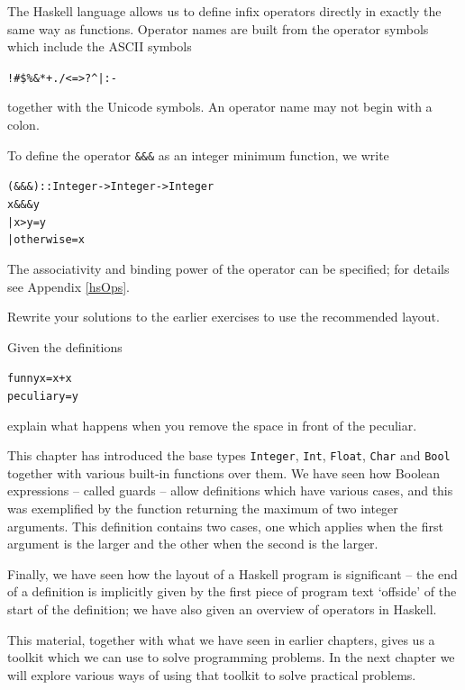 The Haskell language allows us to define infix operators directly in exactly the same way
as functions.
Operator names are built from the operator symbols which include the
ASCII symbols

\begin{alltt}
! \# \$ \% \& * + . / < = > ? \@ \bs{} \^{} | : - \twid
\end{alltt}
together with the Unicode symbols. An operator name may not begin with a
colon.

To define the operator \texttt{\&\&\&} as an integer minimum function, we
write

\begin{alltt}
(\&\&\&) :: Integer -> Integer -> Integer\minx{\&\&\&}
x \&\&\& y 
  | x > y       = y
  | otherwise   = x
\end{alltt}
The associativity and binding power of the operator can be specified; for details
see Appendix \ref{hsOps}.

\begin{exercises}

\item Rewrite your solutions to the earlier exercises to use the recommended
layout.

\item Given the definitions
\begin{alltt}
funny x = x+x
 peculiar y = y
\end{alltt}
explain what happens when you remove the space in front of the {\mi
peculiar}.
\end{exercises}

\begin{summary}
This chapter has introduced the base types \texttt{Integer}, \texttt{Int}, \texttt{Float},
\texttt{Char} and \texttt{Bool} together with various built-in functions over them.
We have seen how Boolean expressions -- called guards -- allow
definitions which have various cases, and this was exemplified by the function
returning the maximum of two integer arguments. This definition contains two
cases, one which applies when the first argument is the larger and the other when the second is the larger.

Finally, we have seen how the layout of a Haskell program is
significant -- the end of a definition is implicitly given by the first
piece of program text `offside' of the start of the definition;  we
have also given an overview of operators in Haskell.

This material, together with what we have seen in earlier chapters,
gives us a toolkit which we can use to solve programming problems. In
the next chapter we will explore various ways of using that toolkit to
solve practical problems.
\end{summary}
% 



